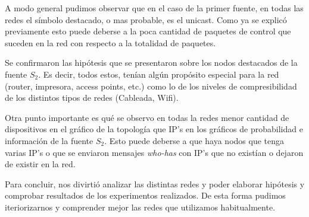 A modo general pudimos observar que en el caso
de la primer fuente, en todas las redes el 
símbolo destacado, o mas probable, es el unicast.
Como ya se explicó previamente esto puede deberse
a la poca cantidad de paquetes de control que suceden
en la red con respecto a la totalidad de paquetes.


Se confirmaron las hipótesis que se presentaron sobre los nodos destacados de
la fuente $S_2$. Es decir, todos estos, tenían algún propósito especial para la
red (router, impresora, access points, etc.) como lo de los niveles
de compresibilidad de los distintos tipos de redes (Cableada, Wifi).


Otra punto importante es qué se observo en todas la redes
menor cantidad de dispositivos en el gráfico de la topología
que IP's en los gráficos de probabilidad e información de la fuente $S_2$.
Esto puede deberse a que haya nodos que tenga varias IP's
o que se enviaron mensajes \textit{who-has} con IP's que no existían o dejaron
de existir en la red.

Para concluir, nos divirtió analizar las distintas redes y poder elaborar hipótesis
y comprobar resultados de los experimentos realizados. De esta forma pudimos iteriorizarnos
y comprender mejor las redes que utilizamos habitualmente.

